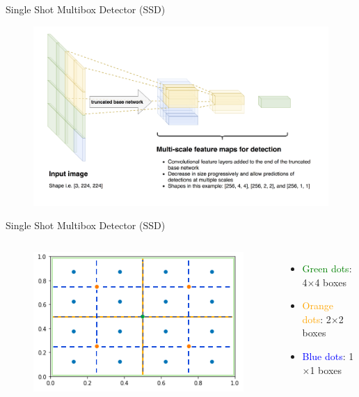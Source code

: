 \documentclass[aspectratio=169]{beamer}
\begin{document}
\begin{frame}{Single Shot Multibox Detector (SSD)}
\begin{figure}
    \centering
    \includegraphics[scale=.35]{demo/figs/ssd3.png}
\end{figure}
\end{frame}

\begin{frame}{Single Shot Multibox Detector (SSD)}
\begin{columns}[T, c]
\begin{figure}
    \centering
    \includegraphics[scale=.35]{demo/figs/ssd4.png}
\end{figure}
\begin{itemize}
    \item \textcolor{green}{Green dots}: 4$\times$4 boxes
    \item \textcolor{orange}{Orange dots}: 2$\times$2 boxes
    \item \textcolor{blue}{Blue dots}: 1$\times$1 boxes
\end{itemize}
\end{columns}
\end{frame}
\end{document}
